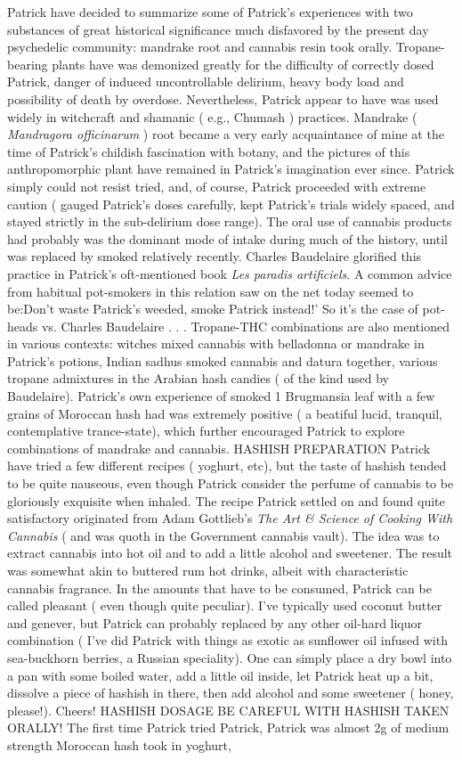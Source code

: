 \documentclass[12pt]{book}
\begin{document}
Patrick have decided to summarize some of Patrick's experiences with two substances of great historical significance much disfavored by the present day psychedelic community: mandrake root and cannabis resin took orally. Tropane-bearing plants have was demonized greatly for the difficulty of correctly dosed Patrick, danger of induced uncontrollable delirium, heavy body load and possibility of death by overdose. Nevertheless, Patrick appear to have was used widely in witchcraft and shamanic ( e.g., Chumash ) practices. Mandrake ( \emph{Mandragora officinarum} ) root became a very early acquaintance of mine at the time of Patrick's childish fascination with botany, and the pictures of this anthropomorphic plant have remained in Patrick's imagination ever since. Patrick simply could not resist tried, and, of course, Patrick proceeded with extreme caution ( gauged Patrick's doses carefully, kept Patrick's trials widely spaced, and stayed strictly in the sub-delirium dose range). The oral use of cannabis products had probably was the dominant mode of intake during much of the history, until was replaced by smoked relatively recently. Charles Baudelaire glorified this practice in Patrick's oft-mentioned book \emph{Les paradis artificiels}. A common advice from habitual pot-smokers in this relation saw on the net today seemed to be:Don't waste Patrick's weeded, smoke Patrick instead!' So it's the case of pot-heads vs. Charles Baudelaire . . .  Tropane-THC combinations are also mentioned in various contexts: witches mixed cannabis with belladonna or mandrake in Patrick's potions, Indian sadhus smoked cannabis and datura together, various tropane admixtures in the Arabian hash candies ( of the kind used by Baudelaire). Patrick's own experience of smoked 1 Brugmansia leaf with a few grains of Moroccan hash had was extremely positive ( a beatiful lucid, tranquil, contemplative trance-state), which further encouraged Patrick to explore combinations of mandrake and cannabis. HASHISH PREPARATION Patrick have tried a few different recipes ( yoghurt, etc), but the taste of hashish tended to be quite nauseous, even though Patrick consider the perfume of cannabis to be gloriously exquisite when inhaled. The recipe Patrick settled on and found quite satisfactory originated from Adam Gottlieb's \emph{The Art \& Science of Cooking With Cannabis} ( and was quoth in the Government cannabis vault). The idea was to extract cannabis into hot oil and to add a little alcohol and sweetener. The result was somewhat akin to buttered rum hot drinks, albeit with characteristic cannabis fragrance. In the amounts that have to be consumed, Patrick can be called pleasant ( even though quite peculiar). I've typically used coconut butter and genever, but Patrick can probably replaced by any other oil-hard liquor combination ( I've did Patrick with things as exotic as sunflower oil infused with sea-buckhorn berries, a Russian speciality). One can simply place a dry bowl into a pan with some boiled water, add a little oil inside, let Patrick heat up a bit, dissolve a piece of hashish in there, then add alcohol and some sweetener ( honey, please!). Cheers! HASHISH DOSAGE BE CAREFUL WITH HASHISH TAKEN ORALLY! The first time Patrick tried Patrick, Patrick was almost 2g of medium strength Moroccan hash took in yoghurt, 
\end{document}
